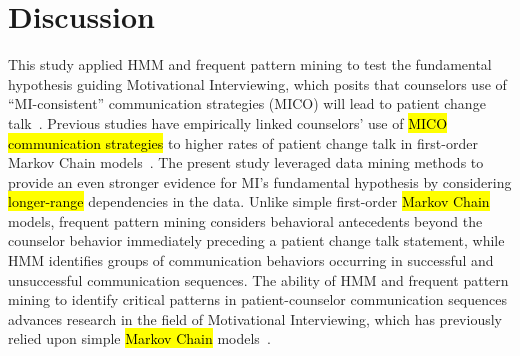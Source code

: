 \documentclass[smallextended]{svjour3}       %
\begin{document}
\section{Discussion}
\label{sec:discussion}
This study applied HMM and frequent pattern mining to test the fundamental hypothesis guiding Motivational Interviewing, which posits that counselors use of ``MI-consistent'' communication strategies (MICO) will lead to patient change talk~\cite{miller2009toward}. Previous studies have empirically linked counselors' use of \hl{MICO communication strategies} to higher rates of patient change talk in first-order Markov Chain models~\cite{moyers2006therapist, moyers2009session, gaume2010counselor}. The present study leveraged data mining methods to provide an even stronger evidence for MI's fundamental hypothesis by considering \hl{longer-range} dependencies in the data. Unlike simple first-order \hl{Markov Chain} models, frequent pattern mining considers behavioral antecedents beyond the counselor behavior immediately preceding a patient change talk statement, while HMM identifies groups of communication behaviors occurring in successful and unsuccessful communication sequences. The ability of HMM and frequent pattern mining to identify critical patterns in patient-counselor communication sequences advances research in the field of Motivational Interviewing, which has previously relied upon simple \hl{Markov Chain} models~\cite{moyers2006therapist, moyers2009session, gaume2008counsellor, gaume2010counselor, glynn2014change, carcone2013provider, jacques2016building}.
\end{document}

